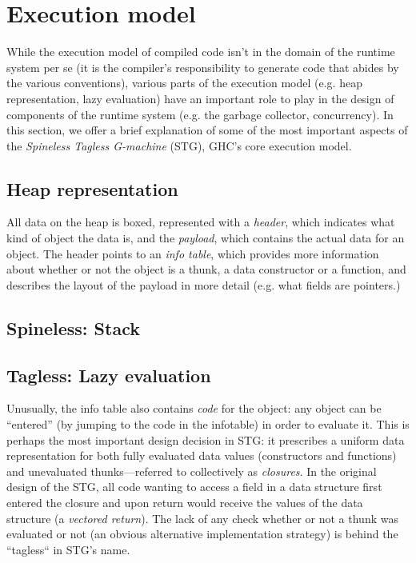 \section{Execution model}

While the execution model of compiled code isn't in the domain of the
runtime system per se (it is the compiler's responsibility to generate
code that abides by the various conventions), various parts of the
execution model (e.g. heap representation, lazy evaluation) have an important
role to play in the design of components of the runtime system (e.g. the
garbage collector, concurrency).  In this section, we offer a brief
explanation of some of the most important aspects of the \emph{Spineless Tagless G-machine} (STG),
GHC's core execution model.

\subsection{Heap representation}

All data on the heap is boxed, represented with a \emph{header}, which
indicates what kind of object the data is, and the \emph{payload}, which
contains the actual data for an object.  The header points to an
\emph{info table}, which provides more information about whether or not
the object is a thunk, a data constructor or a function, and describes
the layout of the payload in more detail (e.g. what fields are
pointers.) 

\subsection{Spineless: Stack}





\subsection{Tagless: Lazy evaluation}

Unusually, the info table also contains \emph{code} for the object: any
object can be ``entered'' (by jumping to the code in the infotable) in
order to evaluate it.  This is perhaps the most important design
decision in STG: it prescribes a uniform data representation for both
fully evaluated data values (constructors and functions) and unevaluated
thunks---referred to collectively as \emph{closures}.  In the original
design of the STG, all code wanting to access a field in a data
structure first entered the closure and upon return would receive the
values of the data structure (a \emph{vectored return}).  The lack of
any check whether or not a thunk was evaluated or not (an obvious
alternative implementation strategy) is behind the ``tagless`` in STG's
name.

